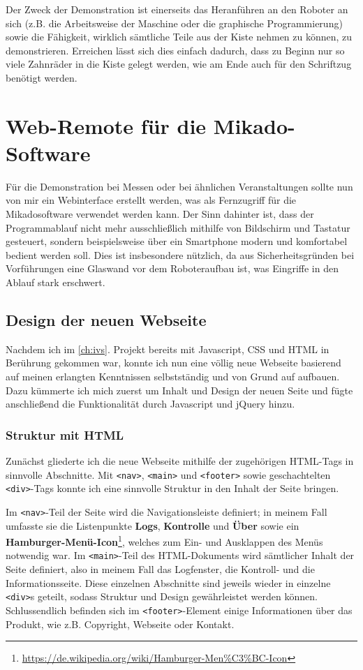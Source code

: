 \documentclass[xcolor=dvipsnames,11pt,paper=a4paper]{report}
\begin{document}
Der Zweck der Demonstration ist einerseits das Heranführen an den Roboter an sich
(z.B. die Arbeitsweise der Maschine oder die graphische Programmierung) sowie die
Fähigkeit, wirklich sämtliche Teile aus der Kiste nehmen zu können, zu demonstrieren.
Erreichen lässt sich dies einfach dadurch, dass zu Beginn nur so viele Zahnräder
in die Kiste gelegt werden, wie am Ende auch für den Schriftzug benötigt werden.



\section{Web-Remote für die Mikado-Software}

Für die Demonstration bei Messen oder bei ähnlichen Veranstaltungen sollte nun von
mir ein Webinterface erstellt werden, was als Fernzugriff für die Mikadosoftware
verwendet werden kann. Der Sinn dahinter ist, dass der Programmablauf nicht mehr
ausschließlich mithilfe von Bildschirm und Tastatur gesteuert, sondern beispielsweise
über ein Smartphone modern und komfortabel bedient werden soll. Dies ist insbesondere
nützlich, da aus Sicherheitsgründen bei Vorführungen eine Glaswand vor dem Roboteraufbau
ist, was Eingriffe in den Ablauf stark erschwert.


\subsection{Design der neuen Webseite}

Nachdem ich im \ref{ch:ivs}. Projekt bereits mit Javascript, CSS und HTML in Berührung
gekommen war, konnte ich nun eine völlig neue Webseite basierend auf meinen erlangten
Kenntnissen selbstständig und von Grund auf aufbauen. Dazu kümmerte ich mich zuerst
um Inhalt und Design der neuen Seite und fügte anschließend die Funktionalität durch
Javascript und jQuery hinzu.

\subsubsection{Struktur mit HTML}

Zunächst gliederte ich die neue Webseite mithilfe der zugehörigen HTML-Tags in sinnvolle
Abschnitte. Mit \texttt{<nav>}, \texttt{<main>} und \texttt{<footer>} sowie geschachtelten
\texttt{<div>}-Tags konnte ich eine sinnvolle Struktur in den Inhalt der Seite bringen.

Im \texttt{<nav>}-Teil der Seite wird die Navigationsleiste definiert; in meinem
Fall umfasste sie die Listenpunkte \textbf{Logs}, \textbf{Kontrolle} und \textbf{Über}
sowie ein \textbf{Hamburger-Menü-Icon}\footnote{\url{https://de.wikipedia.org/wiki/Hamburger-Men\%C3\%BC-Icon}},
welches zum Ein- und Ausklappen des Menüs notwendig war. Im \texttt{<main>}-Teil
des HTML-Dokuments wird sämtlicher Inhalt der Seite definiert, also in meinem Fall
das Logfenster, die Kontroll- und die Informationsseite. Diese einzelnen Abschnitte
sind jeweils wieder in einzelne \texttt{<div>}s geteilt, sodass Struktur und Design
gewährleistet werden können. Schlussendlich befinden sich im \texttt{<footer>}-Element
einige Informationen über das Produkt, wie z.B. Copyright, Webseite oder Kontakt.
\end{document}
